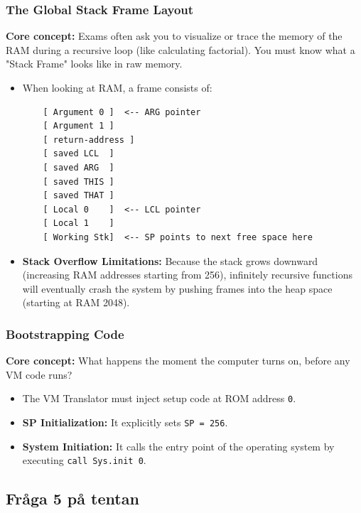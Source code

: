 \documentclass[12pt,a4paper]{article}
\begin{document}
\subsubsection*{The Global Stack Frame Layout}
\textbf{Core concept:} Exams often ask you to visualize or trace the memory of the RAM during a recursive loop (like calculating factorial). You must know what a "Stack Frame" looks like in raw memory.
\begin{itemize}
    \item When looking at RAM, a frame consists of:
    \begin{verbatim}
    [ Argument 0 ]  <-- ARG pointer
    [ Argument 1 ]
    [ return-address ]
    [ saved LCL  ]
    [ saved ARG  ]
    [ saved THIS ]
    [ saved THAT ]  
    [ Local 0    ]  <-- LCL pointer
    [ Local 1    ]
    [ Working Stk]  <-- SP points to next free space here
    \end{verbatim}
    \item \textbf{Stack Overflow Limitations:} Because the stack grows downward (increasing RAM addresses starting from 256), infinitely recursive functions will eventually crash the system by pushing frames into the heap space (starting at RAM 2048).
\end{itemize}

\subsubsection*{Bootstrapping Code}
\textbf{Core concept:} What happens the moment the computer turns on, before any VM code runs?
\begin{itemize}
    \item The VM Translator must inject setup code at ROM address \texttt{0}.
    \item \textbf{SP Initialization:} It explicitly sets \texttt{SP = 256}.
    \item \textbf{System Initiation:} It calls the entry point of the operating system by executing \texttt{call Sys.init 0}.
\end{itemize}

\subsection*{Fråga 5 på tentan}
\end{document}
